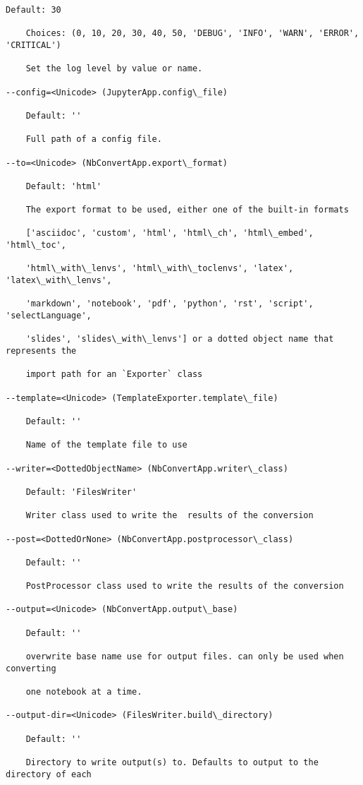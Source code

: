 \documentclass[11pt]{article}
\begin{document}
\begin{Verbatim}[commandchars=\\\{\}]
    Default: 30

    Choices: (0, 10, 20, 30, 40, 50, 'DEBUG', 'INFO', 'WARN', 'ERROR',
'CRITICAL')

    Set the log level by value or name.

--config=<Unicode> (JupyterApp.config\_file)

    Default: ''

    Full path of a config file.

--to=<Unicode> (NbConvertApp.export\_format)

    Default: 'html'

    The export format to be used, either one of the built-in formats

    ['asciidoc', 'custom', 'html', 'html\_ch', 'html\_embed', 'html\_toc',

    'html\_with\_lenvs', 'html\_with\_toclenvs', 'latex', 'latex\_with\_lenvs',

    'markdown', 'notebook', 'pdf', 'python', 'rst', 'script', 'selectLanguage',

    'slides', 'slides\_with\_lenvs'] or a dotted object name that represents the

    import path for an `Exporter` class

--template=<Unicode> (TemplateExporter.template\_file)

    Default: ''

    Name of the template file to use

--writer=<DottedObjectName> (NbConvertApp.writer\_class)

    Default: 'FilesWriter'

    Writer class used to write the  results of the conversion

--post=<DottedOrNone> (NbConvertApp.postprocessor\_class)

    Default: ''

    PostProcessor class used to write the results of the conversion

--output=<Unicode> (NbConvertApp.output\_base)

    Default: ''

    overwrite base name use for output files. can only be used when converting

    one notebook at a time.

--output-dir=<Unicode> (FilesWriter.build\_directory)

    Default: ''

    Directory to write output(s) to. Defaults to output to the directory of each


\end{Verbatim}
\end{document}
